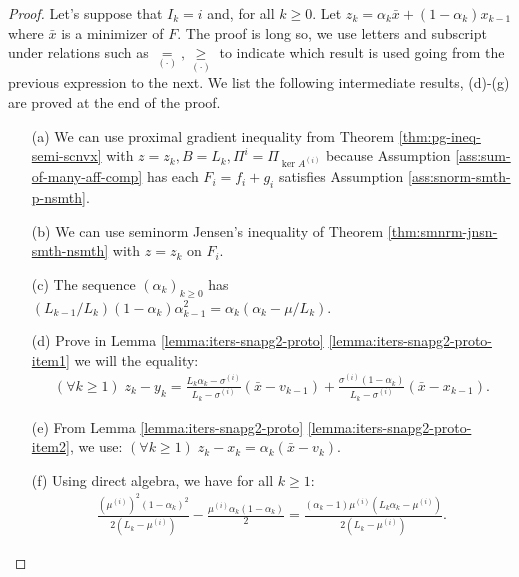 \documentclass[12pt]{article}
\begin{document}
    \begin{proof}
        Let's suppose that $I_k = i$ and, for all $k \ge 0$. 
        Let $z_k = \alpha_k \bar x + (1 - \alpha_k)x_{k - 1}$ where $\bar x$ is a minimizer of $F$. 
        The proof is long so, we use letters and subscript under relations such as $\underset{(\cdot)}{=}, \underset{(\cdot)}{\ge}$ to indicate which result is used going from the previous expression to the next. 
        We list the following intermediate results, (d)-(g) are proved at the end of the proof. 
        \begin{itemize}
            \item[(a)] We can use proximal gradient inequality from Theorem \ref{thm:pg-ineq-semi-scnvx} with $z = z_k, B = L_k, \Pi^{i} = \Pi_{\ker A^{(i)}}$ because Assumption \ref{ass:sum-of-many-aff-comp} has each $F_i = f_i + g_i$ satisfies Assumption \ref{ass:snorm-smth-p-nsmth}. 
            \item[(b)] We can use seminorm Jensen's inequality of Theorem \ref{thm:smnrm-jnsn-smth-nsmth} with $z = z_k$ on $F_i$. 
            \item[(c)] The sequence $(\alpha_k)_{k \ge 0}$ has $(L_{k - 1}/L_k)(1 - \alpha_{k})\alpha_{k - 1}^2 = \alpha_{k}\left(\alpha_{k} - \mu/L_k\right)$. 
            \item[(d)] Prove in Lemma \ref{lemma:iters-snapg2-proto} \ref{lemma:iters-snapg2-proto-item1} we will the equality:
            \begin{align*}
                (\forall k \ge 1)\; 
                z_k - y_k 
                = 
                \frac{L_k\alpha_k - \sigma^{(i)}}{L_k - \sigma^{(i)}}(\bar x - v_{k - 1})
                + \frac{\sigma^{(i)}(1 - \alpha_k)}{L_k - \sigma^{(i)}}(\bar x - x_{k - 1}).
            \end{align*}
            \item [(e)] From Lemma \ref{lemma:iters-snapg2-proto} \ref{lemma:iters-snapg2-proto-item2}, we use: $(\forall k \ge 1)\; z_k - x_k = \alpha_k (\bar x - v_k)$. 
            \item [(f)] Using direct algebra, we have for all $k \ge 1$: 
            \begin{align*}
                \frac{\left(\mu^{(i)}\right)^2(1 - \alpha_k)^2}{2(L_k - \mu^{(i)})} 
                - \frac{\mu^{(i)}\alpha_k(1 - \alpha_k)}{2}
                = \frac{(\alpha_k - 1)\mu^{(i)}\left(L_k\alpha_k - \mu^{(i)}\right)}
                {2\left(L_k - \mu^{(i)}\right)}. 
            \end{align*}

\end{itemize}
\end{proof}
\end{document}
